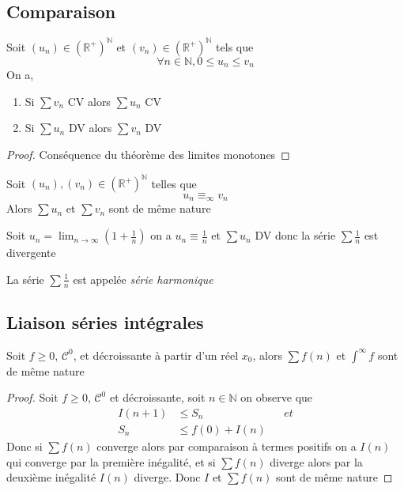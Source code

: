 \documentclass[11pt,colorlinks]{book}
\theoremstyle{mytheoremstyle}
\theoremstyle{mytheoremstyle}
\theoremstyle{mytheoremstyle}
\theoremstyle{mytheoremstyle}
\theoremstyle{mytheoremstyle}
\theoremstyle{mytheoremstyle}
\theoremstyle{mytheoremstyle}
\theoremstyle{mytheoremstyle}
\theoremstyle{myproblemstyle}
\def\mbb#1{\mathbb{#1}}
\def\bN{\mbb{N}}
\def\bR{\mbb{R}}
\def\mC{\mathcal{C}}
\def\ln{\lim_{n \to \infty}}
\def\rNp{\left(\bR^{+}\right)^{\bN}}
\begin{document}
\subsection{Comparaison}
\begin{theorem}
  Soit $(u_n) \in \rNp$ et $(v_n) \in \rNp$ tels que 
  \begin{equation*}
    \forall n \in \bN, 0 \leq u_n \leq v_n
  \end{equation*}
  On a,
  \begin{enumerate}
    \item Si $\sum v_n$ CV alors $\sum u_n$ CV
    \item Si $\sum u_n$ DV alors $\sum v_n$ DV
  \end{enumerate}
  \begin{proof}
    Conséquence du théorème des limites monotones 
  \end{proof}
\end{theorem}
\begin{prop}
  Soit $(u_n),(v_n) \in \rNp$ telles que 
  \begin{equation*}
    u_n \equiv_{\infty} v_n
  \end{equation*}
  Alors $\sum u_n$ et $\sum v_n$ sont de même nature
\end{prop}
\begin{ex}
  Soit $u_n = \ln \left(1 + \frac{1}{n}\right)$ on a $u_n \equiv \frac{1}{n}$ et $\sum u_n$ DV donc la série 
  $\sum \frac{1}{n}$ est divergente
  \begin{rmq}
    La série $\sum \frac{1}{n}$ est appelée \textit{série harmonique}
  \end{rmq}
\end{ex}

\subsection{Liaison séries intégrales}
\begin{theorem}
  Soit $f\geq 0$, $\mC^0$, et décroissante à partir d'un réel $x_0$, alors $\sum f(n)$ et $\int^{\infty} f$ sont de même nature
  \begin{proof}
    Soit $f\geq 0$, $\mC^0$ et décroissante, soit $n \in \bN$ on observe que 
    \begin{align*}
      I(n+1) &\leq S_n && {et} \\ 
      S_n &\leq f(0) + I(n)
    \end{align*}
    Donc si $\sum f(n)$ converge alors par comparaison à termes positifs on a $I(n)$ qui converge par la première inégalité, et 
    si $\sum f(n)$ diverge alors par la deuxième inégalité $I(n)$ diverge. Donc $I$ et $\sum f(n)$ sont de même nature
  \end{proof}
\end{theorem}
\end{document}
